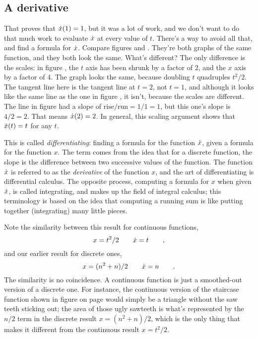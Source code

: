 \subsection{A derivative}\label{scaling}
That proves that $\dot{x}(1)=1$, but it was a lot of work, and we don't want to do
that much work to evaluate $\dot{x}$ at every value of $t$. There's a way to
avoid all that, and find a formula for $\dot{x}$. Compare figures 
and . They're both graphs of the same function, and they both look the same.
What's different? The only difference is the scales: in figure , the $t$ axis
has been shrunk by a factor of 2, and the $x$ axis by a factor of 4. The graph looks the same,
because doubling $t$ quadruples $t^2/2$. The tangent line here is the tangent line at $t=2$,
not $t=1$, and although it looks like the same line as the one in figure ,
it isn't, because the scales are different. The line in figure  had a slope
of $\text{rise}/\text{run}=1/1=1$, but this one's slope is $4/2=2$. That means $\dot{x}(2)=2$.
In general, this scaling argument shows that $\dot{x}(t)=t$ for any $t$.

This is called \emph{differentiating}: finding a formula for the function $\dot{x}$, given a formula
for the function $x$. The term comes from the idea that for a discrete function, the slope is
the difference between two successive values of the function. The function $\dot{x}$ is referred to as
the \emph{derivative} of the function $x$, and the art of differentiating is differential
calculus.
The opposite process, computing a formula for $x$ when given $\dot{x}$,  is called integrating,
and makes up the field of integral calculus;
this terminology is based on the idea that computing
a running sum is like putting together (integrating) many little pieces.

Note the similarity between this result for continuous functions,
\begin{equation*}
  x=t^2/2 \qquad \dot{x}=t \qquad ,
\end{equation*}
and our earlier result for discrete ones,
\begin{equation*}
  x=(n^2+n)/2 \qquad \dot{x}=n \qquad .
\end{equation*}
The similarity is no coincidence. A continuous function is just a smoothed-out version of
a discrete one. For instance, the continuous version of the staircase function shown in figure
 on page \pageref{fig:gauss-solution} would simply be a triangle
without the saw teeth sticking out; the area of those ugly sawteeth is what's represented
by the $n/2$ term in the discrete result $x=(n^2+n)/2$, which is the only thing that makes
it different from the continuous result $x=t^2/2$.

